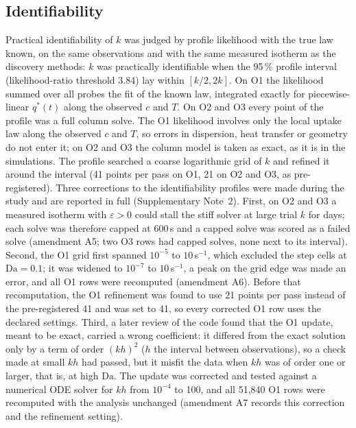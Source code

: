 \documentclass[11pt]{article}
\newcommand{\Da}{\mathrm{Da}}
\newcommand{\qs}{q^{*}}
\begin{document}
\subsection*{Identifiability}
Practical identifiability of $k$ was judged by profile likelihood \citep{raue2009} with the
true law known, on the same observations and with the same measured isotherm as the
discovery methods: $k$ was practically identifiable when the 95\,\% profile interval
(likelihood-ratio threshold 3.84) lay within $[k/2, 2k]$. On O1 the likelihood summed over
all probes the fit of the known law, integrated exactly for piecewise-linear $\qs(t)$ along
the observed $c$ and $T$. On O2 and O3 every point of the profile was a full column solve.
The O1 likelihood involves only the local uptake law along the observed $c$ and $T$, so errors in
dispersion, heat transfer or geometry do not enter it; on O2 and O3 the column model is taken as
exact, as it is in the simulations.
The profile searched a coarse logarithmic grid of $k$ and refined it around the interval
(41 points per pass on O1, 21 on O2 and O3, as pre-registered).
Three corrections to the identifiability profiles were made during the study and are reported
in full (Supplementary Note~2). First, on O2 and O3 a measured isotherm with $\varepsilon > 0$ could stall the stiff
solver at large trial $k$ for days; each solve was therefore capped at 600\,s and a capped
solve was scored as a failed solve (amendment A5; two O3 rows had capped solves, none next to
its interval). Second, the O1 grid first spanned $10^{-5}$ to $10$\,s$^{-1}$, which excluded the
step cells at $\Da = 0.1$; it was widened to $10^{-7}$ to $10$\,s$^{-1}$, a peak on the grid
edge was made an error, and all O1 rows were recomputed (amendment A6). Before that
recomputation, the O1 refinement was found to use 21 points per pass instead of the
pre-registered 41 and was set to 41, so every corrected O1 row uses the declared settings.
Third, a later review of the code found that the O1 update, meant to be exact, carried a wrong
coefficient: it differed from the exact solution only by a term of order $(kh)^2$ ($h$ the
interval between observations), so a check made at small $kh$ had passed, but it misfit the data when $kh$ was of
order one or larger, that is, at high $\Da$. The update was corrected and tested against a
numerical ODE solver for $kh$ from $10^{-4}$ to 100, and all 51,840 O1 rows were recomputed with
the analysis unchanged (amendment A7 records this correction and the refinement setting).
\end{document}
